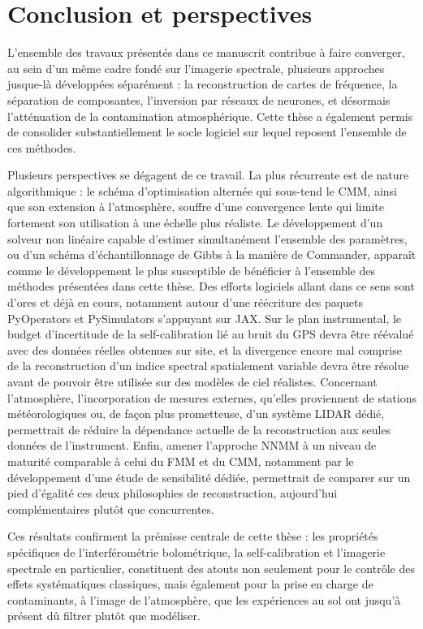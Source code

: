 \section*{Conclusion et perspectives}

L'ensemble des travaux présentés dans ce manuscrit contribue à faire converger, au sein d'un même cadre fondé sur l'imagerie spectrale, plusieurs approches jusque-là développées séparément : la reconstruction de cartes de fréquence, la séparation de composantes, l'inversion par réseaux de neurones, et désormais l'atténuation de la contamination atmosphérique. Cette thèse a également permis de consolider substantiellement le socle logiciel sur lequel reposent l'ensemble de ces méthodes.

Plusieurs perspectives se dégagent de ce travail. La plus récurrente est de nature algorithmique : le schéma d'optimisation alternée qui sous-tend le CMM, ainsi que son extension à l'atmosphère, souffre d'une convergence lente qui limite fortement son utilisation à une échelle plus réaliste. Le développement d'un solveur non linéaire capable d'estimer simultanément l'ensemble des paramètres, ou d'un schéma d'échantillonnage de Gibbs à la manière de Commander, apparaît comme le développement le plus susceptible de bénéficier à l'ensemble des méthodes présentées dans cette thèse. Des efforts logiciels allant dans ce sens sont d'ores et déjà en cours, notamment autour d'une réécriture des paquets PyOperators et PySimulators s'appuyant sur JAX. Sur le plan instrumental, le budget d'incertitude de la self-calibration lié au bruit du GPS devra être réévalué avec des données réelles obtenues sur site, et la divergence encore mal comprise de la reconstruction d'un indice spectral spatialement variable devra être résolue avant de pouvoir être utilisée sur des modèles de ciel réalistes. Concernant l'atmosphère, l'incorporation de mesures externes, qu'elles proviennent de stations météorologiques ou, de façon plus prometteuse, d'un système LIDAR dédié, permettrait de réduire la dépendance actuelle de la reconstruction aux seules données de l'instrument. Enfin, amener l'approche NNMM à un niveau de maturité comparable à celui du FMM et du CMM, notamment par le développement d'une étude de sensibilité dédiée, permettrait de comparer sur un pied d'égalité ces deux philosophies de reconstruction, aujourd'hui complémentaires plutôt que concurrentes.

Ces résultats confirment la prémisse centrale de cette thèse : les propriétés spécifiques de l'interférométrie bolométrique, la self-calibration et l'imagerie spectrale en particulier, constituent des atouts non seulement pour le contrôle des effets systématiques classiques, mais également pour la prise en charge de contaminants, à l'image de l'atmosphère, que les expériences au sol ont jusqu'à présent dû filtrer plutôt que modéliser.
